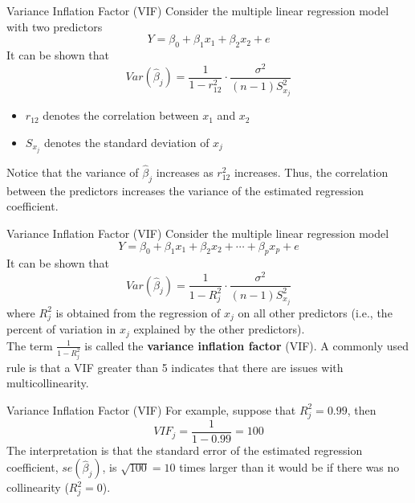 \documentclass[10pt]{beamer}\usepackage[]{graphicx}\usepackage[]{color}
\begin{document}
\begin{frame}{Variance Inflation Factor (VIF)}
Consider the multiple linear regression model with two predictors\\
$$Y = \beta_0 + \beta_1 x_1 + \beta_2 x_2 + e$$
\vspace{5pt}
It can be shown that
$$Var(\hat{\beta}_j) = \frac{1}{1-r^2_{12}} \cdot \frac{\sigma^2}{(n-1)S^2_{x_j}}$$
\begin{itemize}
\item $r_{12}$ denotes the correlation between $x_1$ and $x_2$\\
\item $S_{x_j}$ denotes the standard deviation of $x_j$
\end{itemize}
\vspace{5pt}
Notice that the variance of $\hat{\beta}_j$ increases as $r^2_{12}$ increases.  Thus, the correlation between the predictors increases the variance of the estimated regression coefficient.\\
\end{frame}

\begin{frame}{Variance Inflation Factor (VIF)}
Consider the multiple linear regression model\\
$$Y = \beta_0 + \beta_1 x_1 + \beta_2 x_2 + \cdots + \beta_p x_p + e$$
It can be shown that
$$Var(\hat{\beta}_j) = \frac{1}{1-R_j^2} \cdot \frac{\sigma^2}{(n-1)S^2_{x_j}}$$
where $R^2_j$ is obtained from the regression of $x_j$ on all other predictors (i.e., the percent of variation in $x_j$ explained by the other predictors).\\
\vspace{10pt}
The term $\frac{1}{1-R_j^2}$ is called the \textbf{variance inflation factor} (VIF).  A commonly used rule is that a VIF greater than 5 indicates that there are issues with multicollinearity. 
\end{frame}

\begin{frame}{Variance Inflation Factor (VIF)}
For example, suppose that $R^2_j = 0.99$, then 
$$VIF_j = \frac{1}{1-0.99} = 100$$
The interpretation is that the standard error of the estimated regression coefficient, $se(\hat{\beta}_j)$, is $\sqrt{100} = 10$ times larger than it would be if there was no collinearity ($R^2_j=0$).
\end{frame}
\end{document}
